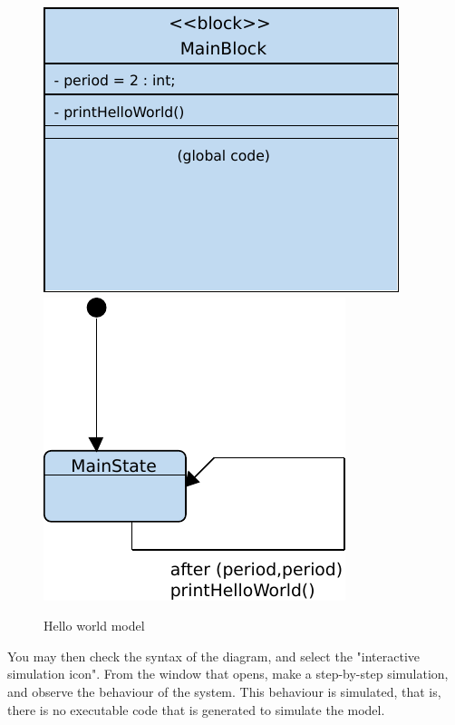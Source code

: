 \documentclass[12pt]{article}
\begin{document}
\begin{figure}[htbp]
\centering
\includegraphics[scale=0.65]{figures/bdhelloworld.pdf}
\hspace{1cm}
\includegraphics[scale=0.65]{figures/smdhelloworld.pdf}
\caption{Hello world model} \label{fig:printhelloworld}
\end{figure}

You may then check the syntax of the diagram, and select the "interactive simulation icon". From the window that opens, make a step-by-step simulation, and observe the behaviour of the system. This behaviour is simulated, that is, there is no executable code that is generated to simulate the model.
\end{document}
